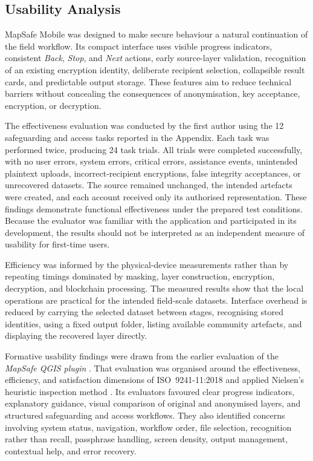 \documentclass[]{interact}
\begin{document}
\subsection{Usability Analysis}

MapSafe Mobile was designed to make secure behaviour a natural continuation of the field workflow. Its compact interface uses visible progress indicators, consistent \emph{Back}, \emph{Stop}, and \emph{Next} actions, early source-layer validation, recognition of an existing encryption identity, deliberate recipient selection, collapsible result cards, and predictable output storage. These features aim to reduce technical barriers without concealing the consequences of anonymisation, key acceptance, encryption, or decryption.

The effectiveness evaluation was conducted by the first author using the 12 safeguarding and access tasks reported in the Appendix. Each task was performed twice, producing 24 task trials. All trials were completed successfully, with no user errors, system errors, critical errors, assistance events, unintended plaintext uploads, incorrect-recipient encryptions, false integrity acceptances, or unrecovered datasets. The source remained unchanged, the intended artefacts were created, and each account received only its authorised representation. These findings demonstrate functional effectiveness under the prepared test conditions. Because the evaluator was familiar with the application and participated in its development, the results should not be interpreted as an independent measure of usability for first-time users.

Efficiency was informed by the physical-device measurements rather than by repeating timings dominated by masking, layer construction, encryption, decryption, and blockchain processing. The measured results show that the local operations are practical for the intended field-scale datasets. Interface overhead is reduced by carrying the selected dataset between stages, recognising stored identities, using a fixed output folder, listing available community artefacts, and displaying the recovered layer directly.

Formative usability findings were drawn from the earlier evaluation of the \textit{MapSafe QGIS plugin} \citep{sharma2025mapsafe}. That evaluation was organised around the effectiveness, efficiency, and satisfaction dimensions of ISO~9241-11:2018 \citep{ISO2018ergonomics} and applied Nielsen's heuristic inspection method \citep{nielsen1995conduct}. Its evaluators favoured clear progress indicators, explanatory guidance, visual comparison of original and anonymised layers, and structured safeguarding and access workflows. They also identified concerns involving system status, navigation, workflow order, file selection, recognition rather than recall, passphrase handling, screen density, output management, contextual help, and error recovery.
\end{document}
